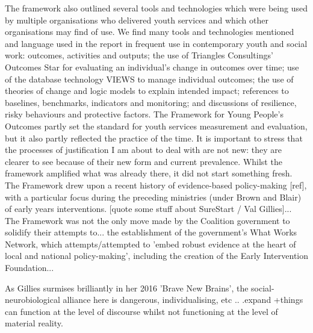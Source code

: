 The framework also outlined several tools and technologies which were being used by multiple organisations who delivered youth services and which other organisations may find of use. We find many tools and technologies mentioned and language used in the report in frequent use in contemporary youth and social work: outcomes, activities and outputs; the use of Triangles Consultings' Outcomes Star for evaluating an individual's change in outcomes over time; use of the database technology VIEWS to manage individual outcomes; the use of theories of change and logic models to explain intended impact; references to baselines, benchmarks, indicators and monitoring; and discussions of resilience, risky behaviours and protective factors. The Framework for Young People's Outcomes partly set the standard for youth services measurement and evaluation, but it also partly reflected the practice of the time. It is important to stress that the processes of justification I am about to deal with are not new: they are clearer to see because of their new form and current prevalence. Whilst the framework amplified what was already there, it did not start something fresh.
The Framework drew upon a recent history of evidence-based policy-making [ref], with a particular focus during the preceding ministries (under Brown and Blair) of early years interventions. [quote some stuff about SureStart / Val Gillies]... The Framework was not the only move made by the Coalition government to solidify their attempts to... the establishment of the government's What Works Network, which attempts/attempted to 'embed robust evidence at the heart of local and national policy-making', including the creation of the Early Intervention Foundation...

As Gillies surmises brilliantly in her 2016 'Brave New Brains', the social-neurobiological alliance here is dangerous, individualising, etc .. .expand
+things can function at the level of discourse whilst not functioning at the level of material reality.

